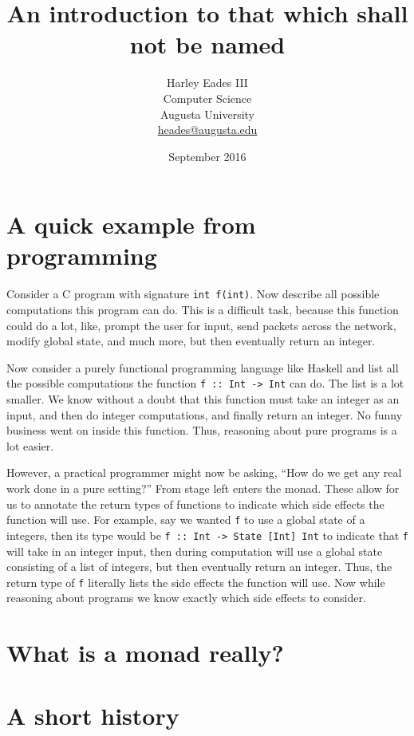 \documentclass{article}
\title{An introduction to that which shall not be named}
\author{Harley Eades III\\Computer Science\\Augusta University\\\href{mailto:heades@augusta.edu}{heades@augusta.edu}}
\date{September 2016}
\begin{document}
\maketitle

\section{A quick example from programming}
\label{sec:a_quick_example_from_programming}
Consider a C program with signature \verb!int f(int)!.  Now describe
all possible computations this program can do.  This is a difficult
task, because this function could do a lot, like, prompt the user for
input, send packets across the network, modify global state, and much
more, but then eventually return an integer.

Now consider a purely functional programming language like Haskell
\cite{Haskell} and list all the possible computations the function
\verb!f :: Int -> Int! can do. The list is a lot smaller.  We know
without a doubt that this function must take an integer as an input,
and then do integer computations, and finally return an integer.  No
funny business went on inside this function.  Thus, reasoning about
pure programs is a lot easier.

However, a practical programmer might now be asking, ``How do we get
any real work done in a pure setting?''  From stage left enters the
monad.  These allow for us to annotate the return types of functions
to indicate which side effects the function will use.  For example,
say we wanted \verb!f! to use a global state of a integers, then its
type would be \verb!f :: Int -> State [Int] Int! to indicate that
\verb!f! will take in an integer input, then during computation will
use a global state consisting of a list of integers, but then
eventually return an integer.  Thus, the return type of \verb!f!
literally lists the side effects the function will use.  Now while
reasoning about programs we know exactly which side effects to
consider.



\section{What is a monad really?}
\label{sec:what_is_a_monad_really}


\section{A short history}
\label{sec:a_short_history}
\cite{Moggi:1988}
\end{document}
